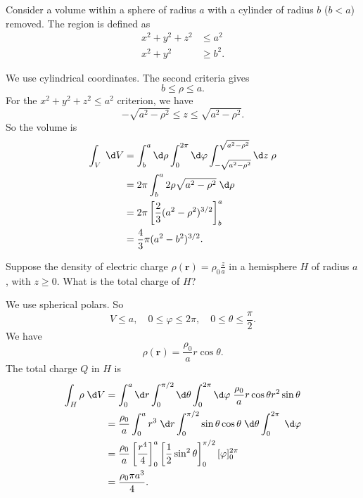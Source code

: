 \documentclass[a4paper]{article}
\begin{document}
\begin{eg}
  Consider a volume within a sphere of radius $a$ with a cylinder of radius $b$ ($b < a$) removed. The region is defined as
  \begin{align*}
    x^2 + y^2 + z^2 &\leq a^2\\
    x^2 + y^2 &\geq b^2.
  \end{align*} 
  \begin{center}
  \end{center}
  We use cylindrical coordinates. The second criteria gives
  \[
    b \leq \rho \leq a.
  \]
  For the $x^2 + y^2 + z^2 \leq a^2$ criterion, we have
  \[
    -\sqrt{a^2 - \rho^2} \leq z \leq \sqrt{a^2 - \rho^2}.
  \]
  So the volume is
  \begin{align*}
    \int_V \;\d V &= \int_b^a\d \rho\int_0^{2\pi}\d \varphi \int_{-\sqrt{a^2 - \rho^2}}^{\sqrt{a^2 - \rho^2}}\d z\; \rho\\
    &= 2\pi\int_b^a 2\rho\sqrt{a^2 - \rho^2}\;\d \rho\\
    &= 2\pi \left[\frac{2}{3}(a^2 - \rho^2)^{3/2}\right]^a_b\\
    &= \frac{4}{3}\pi (a^2 - b^2)^{3/2}.
  \end{align*}
\end{eg}
\begin{eg}
  Suppose the density of electric charge $\rho(\mathbf{r}) = \rho_0 \frac{z}{a}$ in a hemisphere $H$ of radius $a$, with $z \geq 0$. What is the total charge of $H$?

  We use spherical polars. So
  \[
    V \leq a,\quad 0 \leq \varphi \leq 2\pi,\quad 0 \leq \theta \leq \frac{\pi}{2}.
  \]
  We have
  \[
    \rho(\mathbf{r}) = \frac{\rho_0}{a}r\cos \theta.
  \]
  The total charge $Q$ in $H$ is
  \begin{align*}
    \int_H \rho \;\d V &= \int_0^a\d r\int_0^{\pi/2}\d \theta\int_0^{2\pi}\d\varphi\; \frac{\rho_0}{a}r\cos\theta r^2\sin\theta\\
    &= \frac{\rho_0}{a}\int_0^a r^3 \;\d r \int_0^{\pi/2}\sin\theta \cos\theta\;\d \theta \int_0^{2\pi}\;\d \varphi\\
    &= \frac{\rho_0}{a}\left[\frac{r^4}{4}\right]^a_0\left[\frac{1}{2}\sin^2\theta\right]^{\pi/2}_0 [\varphi]^{2\pi}_0\\
    &= \frac{\rho_0 \pi a^3}{4}.
  \end{align*}
\end{eg}
\end{document}
